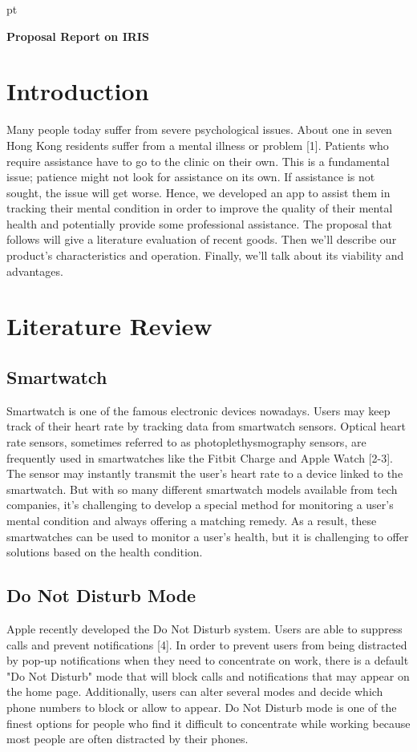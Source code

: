 \documentclass[12pt]{article}
\begin{document}
 pt
\begin{center}
{\bf \LARGE Proposal Report on IRIS}
\end{center}
\vspace{0.3cm}
\section*{Introduction}
Many people today suffer from severe psychological issues. About one in seven Hong Kong residents suffer from a mental illness or problem [1]. Patients who require assistance have to go to the clinic on their own. This is a fundamental issue; patience might not look for assistance on its own. If assistance is not sought, the issue will get worse. Hence, we developed an app to assist them in tracking their mental condition in order to improve the quality of their mental health and potentially provide some professional assistance. The proposal that follows will give a literature evaluation of recent goods. Then we'll describe our product's characteristics and operation. Finally, we'll talk about its viability and advantages.


\section*{Literature Review}
\subsection*{Smartwatch}
Smartwatch is one of the famous electronic devices nowadays. Users may keep track of their heart rate by tracking data from smartwatch sensors. Optical heart rate sensors, sometimes referred to as photoplethysmography sensors, are frequently used in smartwatches like the Fitbit Charge and Apple Watch [2-3]. The sensor may instantly transmit the user's heart rate to a device linked to the smartwatch. But with so many different smartwatch models available from tech companies, it's challenging to develop a special method for monitoring a user's mental condition and always offering a matching remedy. As a result, these smartwatches can be used to monitor a user's health, but it is challenging to offer solutions based on the health condition.


\subsection*{Do Not Disturb Mode}
Apple recently developed the Do Not Disturb system. Users are able to suppress calls and prevent notifications [4]. In order to prevent users from being distracted by pop-up notifications when they need to concentrate on work, there is a default "Do Not Disturb" mode that will block calls and notifications that may appear on the home page. Additionally, users can alter several modes and decide which phone numbers to block or allow to appear. Do Not Disturb mode is one of the finest options for people who find it difficult to concentrate while working because most people are often distracted by their phones.
\newpage
\end{document}
